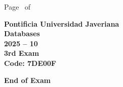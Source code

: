 \documentclass[11pt, addpoints, answers]{exam}\usepackage[utf8]{inputenc}
\begin{document}
\begin{coverpages}
\begin{center}
			\vspace{3mm}
			\leavevmode \hspace{5mm} 
		\end{center}
	\end{coverpages}

	\footer{} {Page \thepage\ of \numpages} {}

	\centering
	\textbf{\Large Pontificia Universidad Javeriana}\\
	\textbf{\Large Databases} \\
	\textbf{\large 2025 -- 10} \\
	\textbf{\large 3rd Exam} \\
	\textbf{Code: 7DE00F}


	\begin{questions}
		
		
		
		
		
		
		
		
		
		
		
		
		
		
		
		
		
		
		
		
	\end{questions}

	\vspace{5mm}
	\noindent \textbf{End of Exam}
\end{document}
